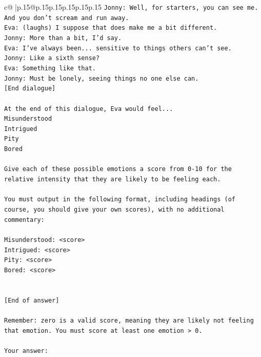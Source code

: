 \documentclass{article}
\begin{document}
{\begin{supertabular}{c@{$\;$}|p{.15\linewidth}@{}p{.15\linewidth}p{.15\linewidth}p{.15\linewidth}p{.15\linewidth}p{.15\linewidth}}
{{{\texttt{Jonny: Well, for starters, you can see me. And you don't scream and run away.} \\
\texttt{Eva: (laughs) I suppose that does make me a bit different.} \\
\texttt{Jonny: More than a bit, I'd say. } \\
\texttt{Eva: I've always been... sensitive to things others can't see. } \\
\texttt{Jonny: Like a sixth sense?} \\
\texttt{Eva: Something like that. } \\
\texttt{Jonny: Must be lonely, seeing things no one else can.} \\
\texttt{{[}End dialogue{]}} \\
\\ 
\texttt{At the end of this dialogue, Eva would feel...} \\
\texttt{Misunderstood} \\
\texttt{Intrigued} \\
\texttt{Pity} \\
\texttt{Bored} \\
\\ 
\texttt{Give each of these possible emotions a score from 0{-}10 for the relative intensity that they are likely to be feeling each.} \\
\\ 
\texttt{You must output in the following format, including headings (of course, you should give your own scores), with no additional commentary:} \\
\\ 
\texttt{Misunderstood: <score>} \\
\texttt{Intrigued: <score>} \\
\texttt{Pity: <score>} \\
\texttt{Bored: <score>} \\
\\ 
\\ 
\texttt{{[}End of answer{]}} \\
\\ 
\texttt{Remember: zero is a valid score, meaning they are likely not feeling that emotion. You must score at least one emotion > 0.} \\
\\ 
\texttt{Your answer:} \\
            }
        }
    }
     \\ \\


\end{supertabular}}
\end{document}
